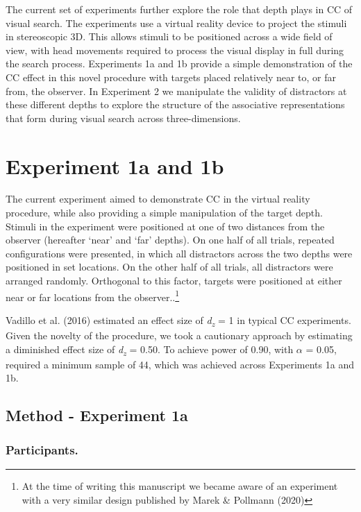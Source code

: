 \documentclass[
  english,
  man,floatsintext]{apa7}
\begin{document}
The current set of experiments further explore the role that depth plays in CC of visual search. The experiments use a virtual reality device to project the stimuli in stereoscopic 3D. This allows stimuli to be positioned across a wide field of view, with head movements required to process the visual display in full during the search process. Experiments 1a and 1b provide a simple demonstration of the CC effect in this novel procedure with targets placed relatively near to, or far from, the observer. In Experiment 2 we manipulate the validity of distractors at these different depths to explore the structure of the associative representations that form during visual search across three-dimensions.

\hypertarget{experiment-1a-and-1b}{%
\section{Experiment 1a and 1b}\label{experiment-1a-and-1b}}

The current experiment aimed to demonstrate CC in the virtual reality procedure, while also providing a simple manipulation of the target depth. Stimuli in the experiment were positioned at one of two distances from the observer (hereafter `near' and `far' depths). On one half of all trials, repeated configurations were presented, in which all distractors across the two depths were positioned in set locations. On the other half of all trials, all distractors were arranged randomly. Orthogonal to this factor, targets were positioned at either near or far locations from the observer..\footnote{At the time of writing this manuscript we became aware of an experiment with a very similar design published by Marek \& Pollmann (2020)}

Vadillo et al. (2016) estimated an effect size of \emph{d\textsubscript{z}} = 1 in typical CC experiments. Given the novelty of the procedure, we took a cautionary approach by estimating a diminished effect size of \emph{d\textsubscript{z}} = 0.50. To achieve power of 0.90, with \(\alpha\) = 0.05, required a minimum sample of 44, which was achieved across Experiments 1a and 1b.

\hypertarget{method---experiment-1a}{%
\subsection{Method - Experiment 1a}\label{method---experiment-1a}}

\hypertarget{participants.}{%
\subsubsection{Participants.}\label{participants.}}
\end{document}
